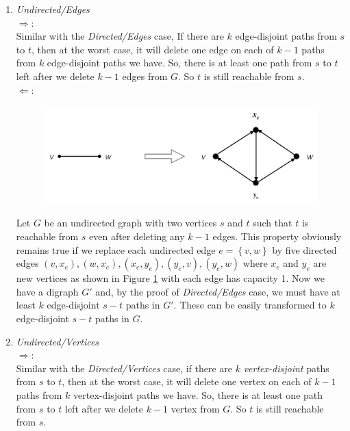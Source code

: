 \begin{enumerate}
	\item \textit{Undirected/Edges}\\
	$\Rightarrow$:\\
	Similar with the \textit{Directed/Edges} case, If there are $k$ edge-disjoint paths from $s$ to $t$, then at the worst case, it will delete one edge on each of $k - 1$ paths from $k$ edge-disjoint paths we have. So, there is at least one path from $s$ to $t$ left after we delete $k - 1$ edges from $G$. So $t$ is still reachable from $s$.\\

	$\Leftarrow$:\\
	\begin{figure}[h]
	\centering
	\includegraphics[scale=0.4]{hw4p5a}
	\caption{}
	\label{fig:p5a}
	\end{figure}
	Let $G$ be an undirected graph with two vertices $s$ and $t$ such that $t$ is reachable from $s$ even after deleting any $k - 1$ edges. This property obviously remains true if we replace each undirected edge $e = \left\{ v, w \right\}$  by five directed edges $(v, x_e), (w, x_e), (x_e, y_e), (y_e, v), (y_e, w)$ where $x_e$ and $y_e$ are new vertices as shown in Figure \ref{fig:p5a} with each edge has capacity 1. Now we have a digraph $G'$ and, by the proof of \textit{Directed/Edges} case, we must have at least $k$ edge-disjoint $s-t$ paths in $G'$. These can be easily transformed to $k$ edge-disjoint $s-t$ paths in $G$. 

	\item \textit{Undirected/Vertices}\\
	$\Rightarrow$:\\
	Similar with the \textit{Directed/Vertices} case, if there are $k$ \textit{vertex-disjoint} paths from $s$ to $t$, then at the worst case, it will delete one vertex on each of $k - 1$ paths from $k$ vertex-disjoint paths we have. So, there is at least one path from $s$ to $t$ left after we delete $k - 1$ vertex from $G$. So $t$ is still reachable from $s$. \\


\end{enumerate}

